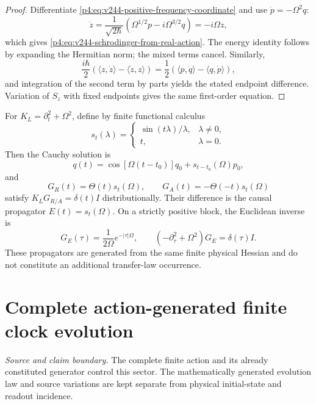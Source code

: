 \documentclass[12pt,a4paper]{article}
\begin{document}
\begin{proof}
Differentiate \eqref{p4:eq:v244-positive-frequency-coordinate} and use
\(\dot p=-\Omega^2q\):
\[
 \dot z
 =\frac1{\sqrt{2\hbar}}
 \left(\Omega^{1/2}p-i\Omega^{3/2}q\right)
 =-i\Omega z,
\]
which gives \eqref{p4:eq:v244-schrodinger-from-real-action}.  The energy
identity follows by expanding the Hermitian norm; the mixed terms cancel.
Similarly,
\[
 \frac{i\hbar}{2}
 \left(\langle z,\dot z\rangle-\langle\dot z,z\rangle\right)
 =\frac12\left(\langle p,\dot q\rangle-\langle q,\dot p\rangle\right),
\]
and integration of the second term by parts yields the stated endpoint
difference.  Variation of \(S_z\) with fixed endpoints gives the same
first-order equation.
\end{proof}

\begin{corollary}
\label{p4:cor:v244-generated-green-operators}
For \(K_L=\partial_t^2+\Omega^2\), define by finite functional calculus
\[
 s_t(\lambda)=
 \begin{cases}
 \sin(t\lambda)/\lambda,&\lambda\ne0,\\
 t,&\lambda=0.
 \end{cases}
\]
Then the Cauchy solution is
\[
 q(t)=\cos[\Omega(t-t_0)]q_0+s_{t-t_0}(\Omega)p_0,
\]
and
\[
 \boxed{G_R(t)=\Theta(t)s_t(\Omega),\qquad
 G_A(t)=-\Theta(-t)s_t(\Omega)}
\]
satisfy \(K_LG_{R/A}=\delta(t)I\) distributionally.  Their difference is the
causal propagator \(E(t)=s_t(\Omega)\).  On a strictly positive block, the
Euclidean inverse is
\[
 \boxed{G_E(\tau)=\frac1{2\Omega}e^{-|\tau|\Omega}},
 \qquad
 (-\partial_\tau^2+\Omega^2)G_E=\delta(\tau)I.
\]
These propagators are generated from the same finite physical Hessian and do
not constitute an additional transfer-law occurrence.
\end{corollary}



\section{Complete action-generated finite clock evolution}
\label{p4b:sec:v238-b3}
\noindent\textit{Source and claim boundary.} The complete finite action and its already constituted generator control this sector. The mathematically generated evolution law and source variations are kept separate from physical initial-state and readout incidence.
\end{document}
